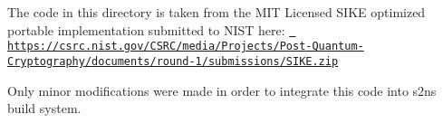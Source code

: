 The code in this directory is taken from the MIT Licensed SIKE optimized portable implementation submitted to NIST here\+: \href{https://csrc.nist.gov/CSRC/media/Projects/Post-Quantum-Cryptography/documents/round-1/submissions/SIKE.zip}{\texttt{ https\+://csrc.\+nist.\+gov/\+CSRC/media/\+Projects/\+Post-\/\+Quantum-\/\+Cryptography/documents/round-\/1/submissions/\+SIKE.\+zip}}

Only minor modifications were made in order to integrate this code into s2n\textquotesingle{}s build system. 